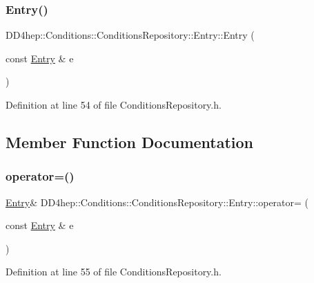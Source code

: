 \subsubsection{\texorpdfstring{Entry()}{Entry()}\hspace{0.1cm}{\footnotesize\ttfamily [2/2]}}
{\footnotesize\ttfamily D\+D4hep\+::\+Conditions\+::\+Conditions\+Repository\+::\+Entry\+::\+Entry (\begin{DoxyParamCaption}\item[{const \hyperlink{class_d_d4hep_1_1_conditions_1_1_conditions_repository_1_1_entry}{Entry} \&}]{e }\end{DoxyParamCaption})\hspace{0.3cm}{\ttfamily [inline]}}



Definition at line 54 of file Conditions\+Repository.\+h.



\subsection{Member Function Documentation}
\hypertarget{class_d_d4hep_1_1_conditions_1_1_conditions_repository_1_1_entry_a6d1dd37eaf5e954821998aaa3daa42a3}{}\label{class_d_d4hep_1_1_conditions_1_1_conditions_repository_1_1_entry_a6d1dd37eaf5e954821998aaa3daa42a3} 
\subsubsection{\texorpdfstring{operator=()}{operator=()}}
{\footnotesize\ttfamily \hyperlink{class_d_d4hep_1_1_conditions_1_1_conditions_repository_1_1_entry}{Entry}\& D\+D4hep\+::\+Conditions\+::\+Conditions\+Repository\+::\+Entry\+::operator= (\begin{DoxyParamCaption}\item[{const \hyperlink{class_d_d4hep_1_1_conditions_1_1_conditions_repository_1_1_entry}{Entry} \&}]{e }\end{DoxyParamCaption})\hspace{0.3cm}{\ttfamily [inline]}}



Definition at line 55 of file Conditions\+Repository.\+h.



